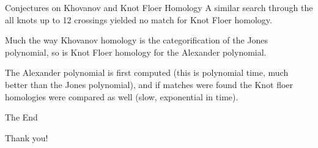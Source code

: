 \documentclass{beamer}
\begin{document}
    \begin{frame}{Conjectures on Khovanov and Knot Floer Homology}
        A similar search through the all knots up to 12 crossings yielded no
        match for Knot Floer homology.
        \par\hfill\par
        Much the way Khovanov homology is the categorification of the Jones
        polynomial, so is Knot Floer homology for the Alexander polynomial.
        \par\hfill\par
        The Alexander polynomial is first computed (this is polynomial time,
        much better than the Jones polynomial), and if matches were found the
        Knot floer homologies were compared as well (slow, exponential in time).
    \end{frame}
    \begin{frame}{The End}
        \begin{center}
            Thank you!
        \end{center}
    \end{frame}
\end{document}
